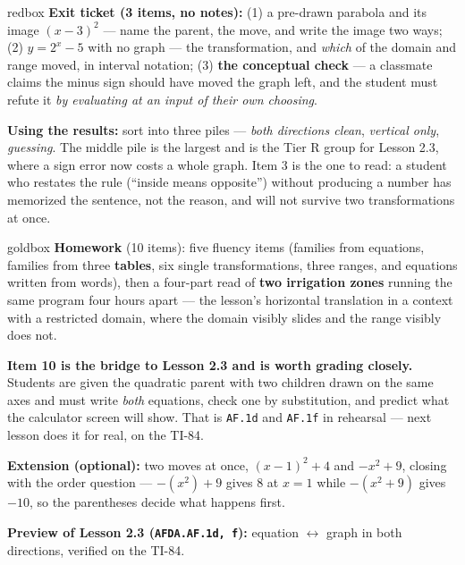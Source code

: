 \documentclass[10pt]{article}
\begin{document}
\boxguard[16]
\begin{skillbox}{redbox}
\textbf{Exit ticket (3 items, no notes):} (1) a pre-drawn parabola and its image $(x-3)^2$ ---
name the parent, the move, and write the image two ways; (2) $y=2^x-5$ with no graph --- the
transformation, and \emph{which} of the domain and range moved, in interval notation;
(3) \textbf{the conceptual check} --- a classmate claims the minus sign should have moved the
graph left, and the student must refute it \emph{by evaluating at an input of their own choosing}.

\textbf{Using the results:} sort into three piles --- \emph{both directions clean},
\emph{vertical only}, \emph{guessing}. The middle pile is the largest and is the Tier R group for
Lesson 2.3, where a sign error now costs a whole graph. Item 3 is the one to read: a student who
restates the rule (``inside means opposite'') without producing a number has memorized the
sentence, not the reason, and will not survive two transformations at once.
\end{skillbox}

\boxguard[18]
\begin{skillbox}{goldbox}
\textbf{Homework} (10 items): five fluency items (families from equations, families from three
\textbf{tables}, six single transformations, three ranges, and equations written from words), then
a four-part read of \textbf{two irrigation zones} running the same program four hours apart --- the
lesson's horizontal translation in a context with a restricted domain, where the domain visibly
slides and the range visibly does not.

\textbf{Item 10 is the bridge to Lesson 2.3 and is worth grading closely.} Students are given the
quadratic parent with two children drawn on the same axes and must write \emph{both} equations,
check one by substitution, and predict what the calculator screen will show. That is
\texttt{AF.1d} and \texttt{AF.1f} in rehearsal --- next lesson does it for real, on the TI-84.

\textbf{Extension (optional):} two moves at once, $(x-1)^2+4$ and $-x^2+9$, closing with the order
question --- $-(x^2)+9$ gives $8$ at $x=1$ while $-(x^2+9)$ gives $-10$, so the parentheses decide
what happens first.

\textbf{Preview of Lesson 2.3 (\texttt{AFDA.AF.1d, f}):} equation $\leftrightarrow$ graph in both
directions, verified on the TI-84.
\end{skillbox}
\end{document}

